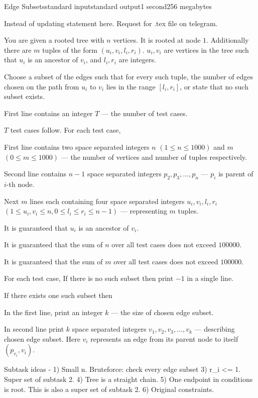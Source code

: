 \begin{problem}{Edge Subsets}{standard input}{standard output}{1 second}{256 megabytes}

Instead of updating statement here. Request for .tex file on telegram.

You are given a rooted tree with $n$ vertices. It is rooted at node $1$. Additionally there are $m$ tuples of the form $(u_i ,v_i ,l_i ,r_i)$. $u_i,v_i$ are vertices in the tree such that $u_i$ is an ancestor of $v_i$, and $l_i,r_i$ are integers.

Choose a subset of the edges such that for every such tuple, the number of edges chosen on the path from $u_i$ to $v_i$ lies in the range $[l_i,r_i]$, or state that no such subset exists.

\InputFile
First line contains an integer $T$ --- the number of test cases.

$T$ test cases follow. For each test case,

First line contains two space separated integers $n$ $(1 \leq n \leq 1000 )$ and $m$ $(0 \leq m \leq 1000)$ --- the number of vertices and number of tuples respectively.

Second line contains $n-1$ space separated integers $p_2, p_3, \ldots, p_n$ --- $p_i$ is parent of $i$-th node.

Next $m$ lines each containing four space separated integers $u_i, v_i, l_i, r_i$ $(1 \leq u_i, v_i \leq n, 0 \leq l_i \leq r_i \leq n-1)$ --- representing $m$ tuples.

It is guaranteed that $u_i$ is an ancestor of $v_i$.

It is guaranteed that the sum of $n$ over all test cases does not exceed $100000$.

It is guaranteed that the sum of $m$ over all test cases does not exceed $100000$.


\OutputFile
For each test case,
If there is no such subset then print $-1$ in a single line.

If there exists one such subset then

In the first line, print an integer $k$ --- the size of chosen edge subset. 

In second line print $k$ space separated integers $v_1, v_2, v_3, \ldots, v_k$ --- describing chosen edge subset. Here $v_i$ represents an edge from its parent node to itself $(p_{v_i}, v_i)$. 



\Example

\begin{example}
%
\end{example}

\Note
Subtask ideas -
1) Small n. Bruteforce: check every edge subset
3) r_i <= 1. Super set of subtask 2.
4) Tree is a straight chain. 
5) One endpoint in conditions is root. This is also a super set of subtask 2.
6) Original constraints.

\end{problem}

